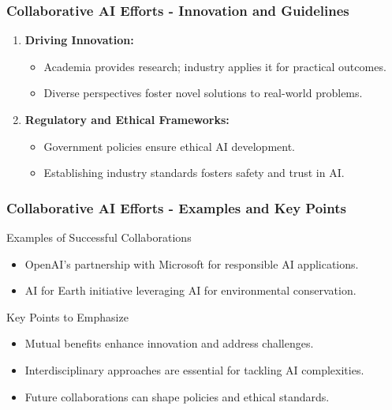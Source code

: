 \documentclass{beamer}
\begin{document}
\begin{frame}[fragile]
    \frametitle{Collaborative AI Efforts - Innovation and Guidelines}
    \begin{enumerate}
        \item \textbf{Driving Innovation:}
        \begin{itemize}
            \item Academia provides research; industry applies it for practical outcomes.
            \item Diverse perspectives foster novel solutions to real-world problems.
        \end{itemize}
        
        \item \textbf{Regulatory and Ethical Frameworks:}
        \begin{itemize}
            \item Government policies ensure ethical AI development.
            \item Establishing industry standards fosters safety and trust in AI.
        \end{itemize}
    \end{enumerate}
\end{frame}

\begin{frame}[fragile]
    \frametitle{Collaborative AI Efforts - Examples and Key Points}
    \begin{block}{Examples of Successful Collaborations}
        \begin{itemize}
            \item OpenAI's partnership with Microsoft for responsible AI applications.
            \item AI for Earth initiative leveraging AI for environmental conservation.
        \end{itemize}
    \end{block}

    \begin{block}{Key Points to Emphasize}
        \begin{itemize}
            \item Mutual benefits enhance innovation and address challenges.
            \item Interdisciplinary approaches are essential for tackling AI complexities.
            \item Future collaborations can shape policies and ethical standards.
        \end{itemize}
    \end{block}
\end{frame}
\end{document}
